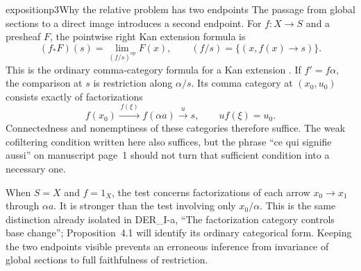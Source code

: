\begin{dcomment}{exposition}{p3}{Why the relative problem has two endpoints}
The passage from global sections to a direct image introduces a second endpoint. For $f:X\to S$ and a presheaf $F$, the pointwise right Kan extension formula is
\[
 (f_*F)(s)=\lim_{(f/s)^{\mathrm{op}}}F(x),
 \qquad (f/s)=\{(x,f(x)\to s)\}.
\]
This is the ordinary comma-category formula for a Kan extension \citep[Theorem~6.2.1 and Corollary~6.2.9]{Riehl2016}. If $f'=f\alpha$, the comparison at $s$ is restriction along $\alpha/s$. Its comma category at $(x_0,u_0)$ consists exactly of factorizations
\[
 f(x_0)\xrightarrow{\,f(\xi)\,}f(\alpha a)
 \xrightarrow{\,u\,}s,
 \qquad u f(\xi)=u_0.
\]
Connectedness and nonemptiness of these categories therefore suffice. The weak cofiltering condition written here also suffices, but the phrase ``ce qui signifie aussi'' on manuscript page~1 should not turn that sufficient condition into a necessary one.

When $S=X$ and $f=1_X$, the test concerns factorizations of each arrow $x_0\to x_1$ through $\alpha a$. It is stronger than the test involving only $x_0/\alpha$. This is the same distinction already isolated in DER\_I-a, ``The factorization category controls base change''; Proposition~4.1 will identify its ordinary categorical form. Keeping the two endpoints visible prevents an erroneous inference from invariance of global sections to full faithfulness of restriction.
\end{dcomment}

